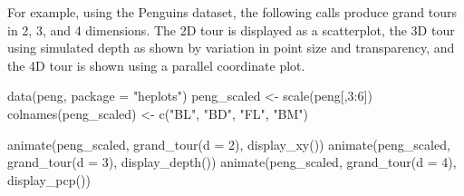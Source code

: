 \documentclass[
  letterpaper,
  10pt,
  krantz2]{krantz}
\makeatletter
\newenvironment{Shaded}{\begin{snugshade}}{\end{snugshade}}
\newcommand{\AttributeTok}[1]{\textcolor[rgb]{0.40,0.45,0.13}{#1}}
\newcommand{\DecValTok}[1]{\textcolor[rgb]{0.68,0.00,0.00}{#1}}
\newcommand{\FunctionTok}[1]{\textcolor[rgb]{0.28,0.35,0.67}{#1}}
\newcommand{\NormalTok}[1]{\textcolor[rgb]{0.00,0.23,0.31}{#1}}
\newcommand{\OtherTok}[1]{\textcolor[rgb]{0.00,0.23,0.31}{#1}}
\newcommand{\SpecialCharTok}[1]{\textcolor[rgb]{0.37,0.37,0.37}{#1}}
\newcommand{\StringTok}[1]{\textcolor[rgb]{0.13,0.47,0.30}{#1}}
\newenvironment{kframe}{%
  \medskip{}
  \setlength{\fboxsep}{.8em}
  \def\at@end@of@kframe{}%
  \ifinner\ifhmode%
  \def\at@end@of@kframe{\end{minipage}}%
  \begin{minipage}{\columnwidth}%
  \fi\fi%
  \def\FrameCommand##1{\hskip\@totalleftmargin \hskip-\fboxsep
  \colorbox{shadecolor}{##1}\hskip-\fboxsep
      \hskip-\linewidth \hskip-\@totalleftmargin \hskip\columnwidth}%
  \MakeFramed {\advance\hsize-\width
    \@totalleftmargin\z@ \linewidth\hsize
    \@setminipage}}%
{\par\unskip\endMakeFramed%
  \at@end@of@kframe}
\renewenvironment{Shaded}{\begin{kframe}}{\end{kframe}}
\makeatother
\begin{document}
For example, using the Penguins dataset, the following calls produce
grand tours in 2, 3, and 4 dimensions. The 2D tour is displayed as a
scatterplot, the 3D tour using simulated depth as shown by variation in
point size and transparency, and the 4D tour is shown using a parallel
coordinate plot.

\begin{Shaded}
\begin{Highlighting}[]
\FunctionTok{data}\NormalTok{(peng, }\AttributeTok{package =} \StringTok{"heplots"}\NormalTok{)}
\NormalTok{peng\_scaled }\OtherTok{\textless{}{-}} \FunctionTok{scale}\NormalTok{(peng[,}\DecValTok{3}\SpecialCharTok{:}\DecValTok{6}\NormalTok{])}
\FunctionTok{colnames}\NormalTok{(peng\_scaled) }\OtherTok{\textless{}{-}} \FunctionTok{c}\NormalTok{(}\StringTok{"BL"}\NormalTok{, }\StringTok{"BD"}\NormalTok{, }\StringTok{"FL"}\NormalTok{, }\StringTok{"BM"}\NormalTok{)}

\FunctionTok{animate}\NormalTok{(peng\_scaled, }\FunctionTok{grand\_tour}\NormalTok{(}\AttributeTok{d =} \DecValTok{2}\NormalTok{), }\FunctionTok{display\_xy}\NormalTok{())}
\FunctionTok{animate}\NormalTok{(peng\_scaled, }\FunctionTok{grand\_tour}\NormalTok{(}\AttributeTok{d =} \DecValTok{3}\NormalTok{), }\FunctionTok{display\_depth}\NormalTok{())}
\FunctionTok{animate}\NormalTok{(peng\_scaled, }\FunctionTok{grand\_tour}\NormalTok{(}\AttributeTok{d =} \DecValTok{4}\NormalTok{), }\FunctionTok{display\_pcp}\NormalTok{())}
\end{Highlighting}
\end{Shaded}
\end{document}
